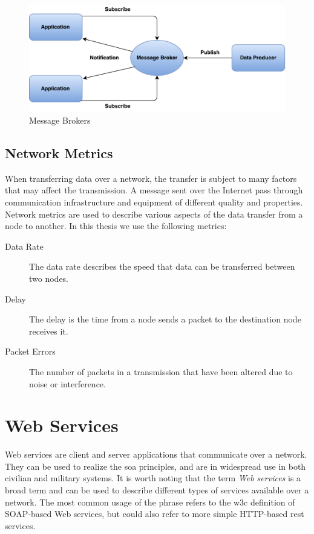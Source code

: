 \begin{figure}[h]
\centering
\includegraphics[scale=0.6]{images/pubsub.pdf}
\caption{Message Brokers}
\label{figure-message-brokers}
\end{figure}


\subsection{Network Metrics}

When transferring data over a network, the transfer is subject to many factors
that may affect the transmission. A message sent over the Internet pass through
communication infrastructure and equipment of different quality and properties.
Network metrics are used to describe various aspects of the data transfer from a
node to another. In this thesis we use the following metrics:

\begin{description}

\item[Data Rate] The data rate describes the speed that data can be transferred
between two nodes.

\item[Delay] The delay is the time from a node sends a packet to the destination
node receives it.

\item[Packet Errors] The number of packets in a transmission that have been
altered due to noise or interference.

\end{description}


\section{Web Services}
\label{web-services}

Web services are client and server applications that communicate over a network.
They can be used to realize the \gls{soa} principles, and are in widespread use
in both civilian and military systems. It is worth noting that the term
\textit{Web services} is a broad term and can be used to describe different
types of services available over a network. The most common usage of the phrase
refers to the \gls{w3c} definition of SOAP-based Web services, but could also
refer to more simple HTTP-based \gls{rest} services.

